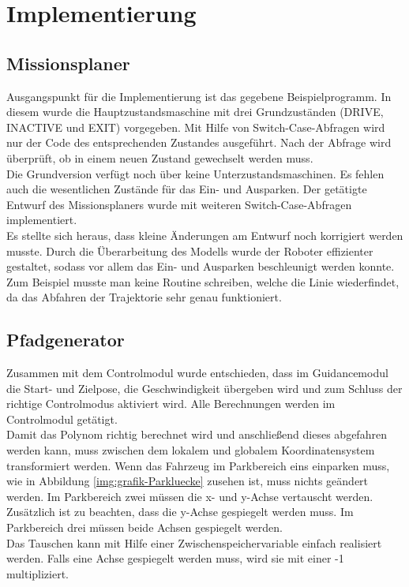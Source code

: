 \chapter{Implementierung}

\section{Missionsplaner}
Ausgangspunkt für die Implementierung ist das gegebene Beispielprogramm. In diesem wurde die Hauptzustandsmaschine mit drei Grundzuständen (DRIVE, INACTIVE und EXIT) vorgegeben. Mit Hilfe von Switch-Case-Abfragen wird nur der Code des entsprechenden Zustandes ausgeführt. Nach der Abfrage wird überprüft, ob in einem neuen Zustand gewechselt werden muss.\\


\noindent Die Grundversion verfügt noch über keine Unterzustandsmaschinen. Es fehlen auch die wesentlichen Zustände für das Ein- und Ausparken. Der getätigte Entwurf des Missionsplaners wurde mit weiteren Switch-Case-Abfragen implementiert. \\

\noindent Es stellte sich heraus, dass kleine Änderungen am Entwurf noch korrigiert werden musste. Durch die Überarbeitung des Modells wurde der Roboter effizienter gestaltet, sodass vor allem das Ein- und Ausparken beschleunigt werden konnte. Zum Beispiel musste man keine Routine schreiben, welche die Linie wiederfindet, da das Abfahren der Trajektorie sehr genau funktioniert.

\section{Pfadgenerator}

Zusammen mit dem Controlmodul wurde entschieden, dass im Guidancemodul die Start- und Zielpose, die Geschwindigkeit übergeben wird und zum Schluss der richtige Controlmodus aktiviert wird. Alle Berechnungen werden im Controlmodul getätigt.\\


\noindent Damit das Polynom richtig berechnet wird und anschließend dieses abgefahren werden kann, muss zwischen dem lokalem und globalem Koordinatensystem transformiert werden. Wenn das Fahrzeug im Parkbereich eins einparken muss, wie in Abbildung \ref{img:grafik-Parkluecke} zusehen ist, muss nichts geändert werden. 
Im Parkbereich zwei müssen die x- und y-Achse vertauscht werden. Zusätzlich ist zu beachten, dass die y-Achse gespiegelt werden muss. Im Parkbereich drei müssen beide Achsen gespiegelt werden. \\
\noindent Das Tauschen kann mit Hilfe einer Zwischenspeichervariable einfach realisiert werden. Falls eine Achse gespiegelt werden muss, wird sie mit einer -1 multipliziert.